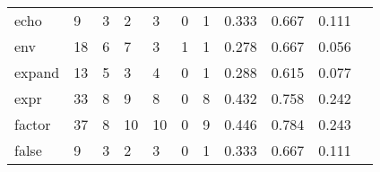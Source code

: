 \begin{longtable}{lp{1.20cm}p{1.20cm}p{1.20cm}p{1.20cm}p{1.20cm}p{1.20cm}p{1.20cm}p{1.20cm}p{1.20cm}p{1.20cm}}
echo      &                                     9 &                                                  3 &                                                  2 &                                                  3 &                                                  0 &                                                  1 &                                         0.333 &                                              0.667 &                                              0.111 \\
env       &                                    18 &                                                  6 &                                                  7 &                                                  3 &                                                  1 &                                                  1 &                                         0.278 &                                              0.667 &                                              0.056 \\
expand    &                                    13 &                                                  5 &                                                  3 &                                                  4 &                                                  0 &                                                  1 &                                         0.288 &                                              0.615 &                                              0.077 \\
expr      &                                    33 &                                                  8 &                                                  9 &                                                  8 &                                                  0 &                                                  8 &                                         0.432 &                                              0.758 &                                              0.242 \\
factor    &                                    37 &                                                  8 &                                                 10 &                                                 10 &                                                  0 &                                                  9 &                                         0.446 &                                              0.784 &                                              0.243 \\
false     &                                     9 &                                                  3 &                                                  2 &                                                  3 &                                                  0 &                                                  1 &                                         0.333 &                                              0.667 &                                              0.111 \\

\end{longtable}
